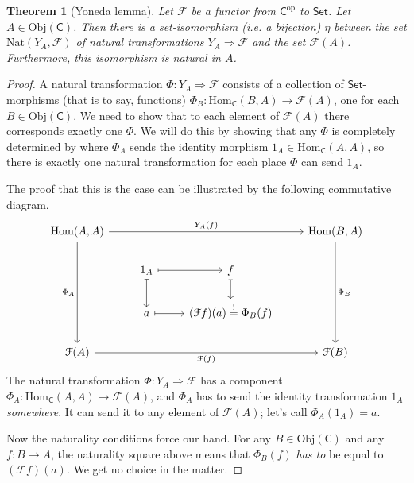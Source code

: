 \documentclass[a4paper]{report}
\newcommand{\Obj}{\mathrm{Obj}}
\newcommand{\Hom}{\mathrm{Hom}}
\newcommand{\Nat}{\mathrm{Nat}}
\theoremstyle{definition}
\theoremstyle{plain}
\newtheorem{theorem}{Theorem}[section]
\theoremstyle{remark}
\begin{document}
\begin{theorem}[Yoneda lemma]
  Let $\mathcal{F}$ be a functor from $\mathsf{C}^{\mathrm{op}}$ to $\mathsf{Set}$. Let $A \in \Obj(\mathsf{C})$. Then there is a set-isomorphism (i.e. a bijection) $\eta$ between the set $\Nat(Y_{A}, \mathcal{F})$ of natural transformations $Y_{A} \Rightarrow \mathcal{F}$ and the set $\mathcal{F}(A)$. Furthermore, this isomorphism is natural in $A$.
\end{theorem}
\begin{proof}
  A natural transformation $\Phi\colon Y_{A} \Rightarrow \mathcal{F}$ consists of a collection of $\mathsf{Set}$-morphisms (that is to say, functions) $\Phi_{B}\colon \Hom_{\mathsf{C}}(B, A) \to \mathcal{F}(A)$, one for each $B \in \Obj(\mathsf{C})$. We need to show that to each element of $\mathcal{F}(A)$ there corresponds exactly one $\Phi$. We will do this by showing that any $\Phi$ is completely determined by where $\Phi_{A}$ sends the identity morphism $1_{A} \in \Hom_{\mathsf{C}}(A, A)$, so there is exactly one natural transformation for each place $\Phi$ can send $1_{A}$.

  The proof that this is the case can be illustrated by the following commutative diagram.
  \begin{equation*}
    \begin{tikzcd}
      \Hom(A, A)
      \arrow[rrr, "Y_{A}(f)"]
      \arrow[ddd, swap, "\Phi_{A}"]
      & & & \Hom(B, A)
      \arrow[ddd, "\Phi_{B}"]
      \\
      & 1_{A}
      \arrow[r, mapsto]
      \arrow[d, mapsto]
      & f
      \arrow[d, mapsto]
      \\
      & a
      \arrow[r, mapsto]
      & (\mathcal{F}f)(a) \stackrel{!}{=} \Phi_{B}(f) 
      \\
      \mathcal{F}(A)
      \arrow[rrr, swap, "\mathcal{F}(f)"]
      & & & \mathcal{F}(B)
    \end{tikzcd}
  \end{equation*}
  The natural transformation $\Phi\colon Y_{A} \Rightarrow \mathcal{F}$ has a component $\Phi_{A}\colon \Hom_{\mathsf{C}}(A, A) \to \mathcal{F}(A)$, and $\Phi_{A}$ has to send the identity transformation $1_{A}$ \emph{somewhere}. It can send it to any element of $\mathcal{F}(A)$; let's call $\Phi_{A}(1_{A}) = a$.

  Now the naturality conditions force our hand. For any $B \in \Obj(\mathsf{C})$ and any $f\colon B \to A$, the naturality square above means that $\Phi_{B}(f)$ \emph{has to} be equal to $(\mathcal{F}f)(a)$. We get no choice in the matter.


\end{proof}
\end{document}
